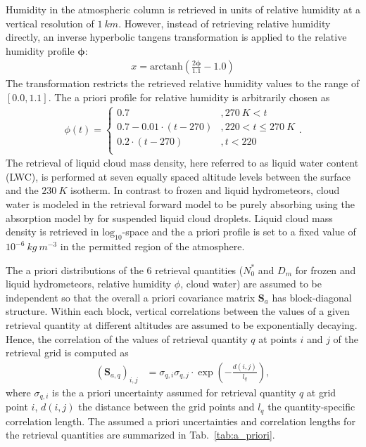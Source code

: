 \documentclass[journal abbreviation, manuscript]{copernicus}
\begin{document}
Humidity in the atmospheric column is retrieved in units of relative humidity at
a vertical resolution of $1\ \unit{km}$. However, instead of retrieving relative
humidity directly, an inverse hyperbolic tangens transformation is applied to
the relative humidity profile $\mathbf{\phi}$:
%
\begin{align}
x = \text{arctanh}(\frac{2 \mathbf{\phi}}{1.1} - 1.0)
\end{align}
%
The transformation restricts the retrieved relative humidity values to
the range of $[0.0, 1.1]$. The a priori profile for relative humidity
is arbitrarily chosen as
%
\begin{align}
\phi(t) = \begin{cases}
 0.7 &, 270\ \unit{K} < t \\
 0.7 - 0.01 \cdot (t - 270) & ,220 < t \leq  270\ \unit{K} \\
 0.2 \cdot (t - 270) & ,t < 220 \\
 \end{cases}.
\end{align}
%
The retrieval of liquid cloud mass density, here referred to as liquid water
content (LWC), is performed at seven equally spaced altitude levels between the
surface and the $230\ \unit{K}$ isotherm. In contrast to frozen and liquid
hydrometeors, cloud water is modeled in the retrieval forward model to be purely
absorbing using the absorption model by \cite{liebe93} for suspended liquid
cloud droplets. Liquid cloud mass density is retrieved in
$\text{log}_{10}$-space and the a priori profile is set to a fixed value of
$10^{-6}\ \unit{kg\ m^{-3}}$ in the permitted region of the atmosphere.

The a priori distributions of the 6 retrieval quantities ($N_0^*$ and $D_m$ for
frozen and liquid hydrometeors, relative humidity $\phi$, cloud water) are
assumed to be independent so that the overall a priori covariance matrix
$\mathbf{S}_a$ has block-diagonal structure. Within each block, vertical
correlations between the values of a given retrieval quantity at different
altitudes are assumed to be exponentially decaying. Hence, the correlation of
the values of retrieval quantity $q$ at points $i$ and $j$ of the retrieval grid
is computed as
%
\begin{align}
\left ( \mathbf{S}_{a,q} \right )_{i, j} &= \sigma_{q,i} \sigma_{q,j}
 \cdot \exp  \left ( -\frac{d(i, j)}{l_q} \right ),
\end{align}
%
where $\sigma_{q, i}$ is the a priori uncertainty assumed for retrieval
quantity $q$ at grid point $i$, $d(i, j)$ the distance between the grid
points and $l_q$ the quantity-specific correlation length. The assumed
a priori uncertainties and correlation lengths for the retrieval quantities
are summarized in Tab.~\ref{tab:a_priori}.
\end{document}
